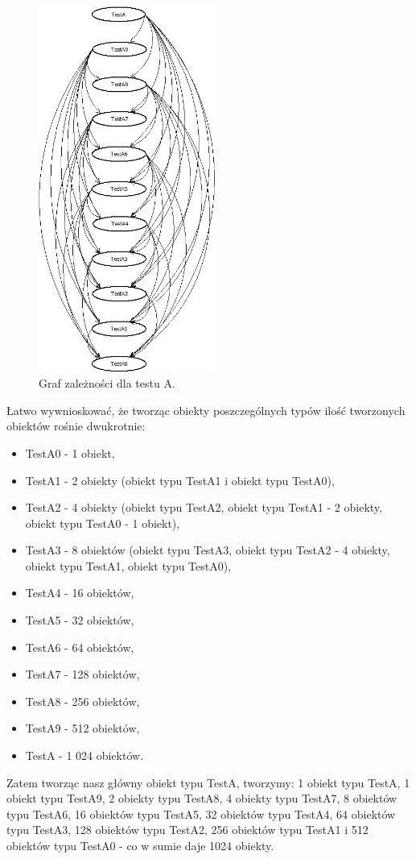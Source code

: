 \documentclass[12pt]{article}
\begin{document}
\begin{figure}[h]
	\begin{center}
  		\includegraphics[height=12cm]{TestA.png}
  		\caption{Graf zależności dla testu A.}
  		\label{fig:testA}
	\end{center}
\end{figure}

Łatwo wywnioskować, że tworząc obiekty poszczególnych typów ilość tworzonych obiektów rośnie dwukrotnie:
\begin{itemize}
	\item TestA0 - 1 obiekt,
	\item TestA1 - 2 obiekty (obiekt typu TestA1 i obiekt typu TestA0),
	\item TestA2 - 4 obiekty (obiekt typu TestA2, obiekt typu TestA1 - 2 obiekty, obiekt typu TestA0 - 1 obiekt),
	\item TestA3 - 8 obiektów (obiekt typu TestA3, obiekt typu TestA2 - 4 obiekty, obiekt typu TestA1, obiekt typu TestA0),
	\item TestA4 - 16 obiektów,
	\item TestA5 - 32 obiektów,
	\item TestA6 - 64 obiektów,
	\item TestA7 - 128 obiektów,
	\item TestA8 - 256 obiektów,
	\item TestA9 - 512 obiektów,
	\item TestA - 1 024 obiektów.
\end{itemize}
Zatem tworząc nasz główny obiekt typu TestA, tworzymy: 1 obiekt typu TestA, 1 obiekt typu TestA9, 2 obiekty typu TestA8, 4 obiekty typu TestA7, 8 obiektów typu TestA6, 16 obiektów typu TestA5, 32 obiektów typu TestA4, 64 obiektów typu TestA3, 128 obiektów typu TestA2, 256 obiektów typu TestA1 i 512 obiektów typu TestA0 - co w sumie daje 1024 obiekty.
\end{document}
